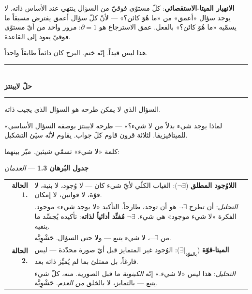 \documentclass[10pt, openany, oneside]{book}
\renewcommand{\normalsize}{\fontsize{10}{13}\selectfont}
\begin{document}
\vspace{0.8em}

\noindent \textbf{الانهيار الميتا-الاستقصائي}: كلّ مستوًى فوقيّ من السؤال ينتهي عند الأساس ذاته. لا يوجد سؤال «أعمق» من «ما هُوَ كائن؟» --- لأنّ كلّ سؤال أعمق يفترض مسبقاً ما يسمّيه «ما هُوَ كائن؟» بالفعل. عمق الاسترجاع هو $\partial = 1$: مرور واحد من أيّ مستوًى فوقيّ يعود إلى القاعدة.

هذا ليس قيداً. إنّه ختم. البرج كان دائماً طابقاً واحداً.

\vspace{1.5em}


\begin{center}
    \rule{0.3\textwidth}{0.4pt}\\[0.5em]
    {\normalsize\bfseries حلّ لايبنتز}\\[0.3em]
    \rule{0.3\textwidth}{0.4pt}
\end{center}

\vspace{1em}

\noindent السؤال الذي لا يمكن طرحه هو السؤال الذي يجيب ذاته.

«لماذا يوجد شيء بدلاً من لا شيء؟» --- طرحه لايبنتز بوصفه السؤال الأساسي للميتافيزيقا. لثلاثة قرون قاوم كلّ جواب. يقاوم لأنّه سيّئ التشكيل.

كلمة «لا شيء» تسمّي شيئين. ميّز بينهما:

\vspace{0.5em}

\textbf{جدول البُرهان 1.3} --- \textit{العدمان}

\vspace{0.5em}

\noindent\begin{tabular}{r p{}}
\textbf{الحالة 1.} & \textbf{اللاوُجود المطلق} ($\neg\exists$): الغياب الكلّي لأيّ شيء كان --- لا وُجود، لا بنية، لا قوّة، لا قوانين، لا إمكان. \\[0.3em]
 & \textit{التحليل}: أن تطرح $\neg\exists$ هو أن توجد، طارحاً. التأكيد «لا يوجد شيء» موجود. الفكرة «لا شيء موجود» هي شيء. $\neg\exists$ \textbf{مُفنِّد أدائياً لذاته}: تأكيده يُجسِّد ما ينفيه. \\[0.3em]
 & من $\neg\exists$، لا شيء يتبع --- ولا حتى السؤال. حَشْوِيَّة. \\[0.5em]
\textbf{الحالة 2.} & \textbf{الميتا-قوّة} ($\exists|_{\text{بالقوّة}}$): الوُجود غير المتمايز قبل أيّ صورة محدّدة --- ليس فارغاً، بل ممتلئ بما لم يُميِّز ذاته بعد. \\[0.3em]
 & \textit{التحليل}: هذا ليس «لا شيء.» إنّه \textit{الكينونة} ما قبل الصورية. منه، كلّ شيء يتبع --- بالتمايز، لا بالخلق \textit{من العدم}. حَشْوِيَّة. \\[0.3em]
\end{tabular}
\end{document}
